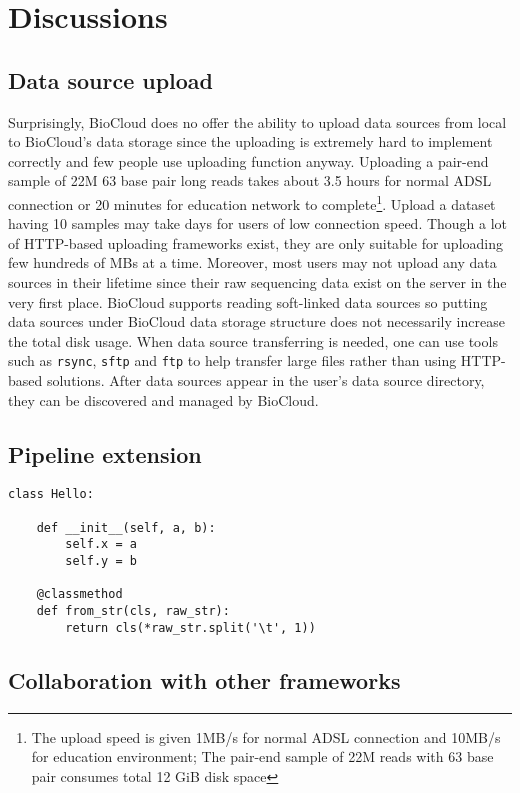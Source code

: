 \chapter{Discussions}
\label{c:discussion}


\section{Data source upload}

Surprisingly, BioCloud does no offer the ability to upload data sources from
local to BioCloud's data storage since the uploading is extremely hard to
implement correctly and few people use uploading function anyway. Uploading a
pair-end sample of 22M 63 base pair long reads takes about 3.5 hours for normal
ADSL connection or 20 minutes for education network to complete\footnote{The
upload speed is given 1MB/s for normal ADSL connection and 10MB/s for education
environment; The pair-end sample of 22M reads with 63 base pair consumes total
12 GiB disk space}. Upload a dataset having 10 samples may take days for users
of low connection speed. Though a lot of HTTP-based uploading frameworks exist,
they are only suitable for uploading few hundreds of MBs at a time. Moreover,
most users may not upload any data sources in their lifetime since their raw
sequencing data exist on the server in the very first place. BioCloud supports
reading soft-linked data sources so putting data sources under BioCloud data
storage structure does not necessarily increase the total disk usage. When data
source transferring is needed, one can use tools such as \texttt{rsync},
\texttt{sftp} and \texttt{ftp} to help transfer large files rather than using
HTTP-based solutions. After data sources appear in the user's data source
directory, they can be discovered and managed by BioCloud.



\section{Pipeline extension}

\begin{lstlisting}
class Hello:

    def __init__(self, a, b):
        self.x = a
        self.y = b

    @classmethod
    def from_str(cls, raw_str):
        return cls(*raw_str.split('\t', 1))
\end{lstlisting}


\section{Collaboration with other frameworks}

